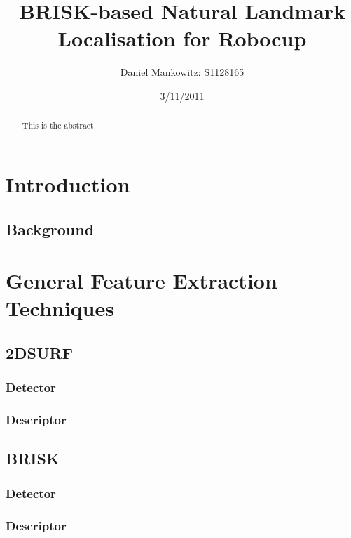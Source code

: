 \documentclass{article}
\title{BRISK-based Natural Landmark Localisation for Robocup}
\author{Daniel Mankowitz: S1128165}
\date{3/11/2011}
\begin{document}
\maketitle

\newpage
\begin{abstract}
This is the abstract
\end{abstract}

\section{Introduction}
\label{sec:introduction}

\subsection{Background}
\label{sec:background}

\section{General Feature Extraction Techniques}
\label{sec:genFeatureExtract}

\subsection{2DSURF}
\label{sec:2dsurf}

\subsubsection{Detector}
\label{2dsurfdetect}

\subsubsection{Descriptor}
\label{2dsurfdescribe}

\subsection{BRISK}
\label{sec:brisk}

\subsubsection{Detector}
\label{briskDetect}

\subsubsection{Descriptor}
\label{briskDescribe}
\end{document}
